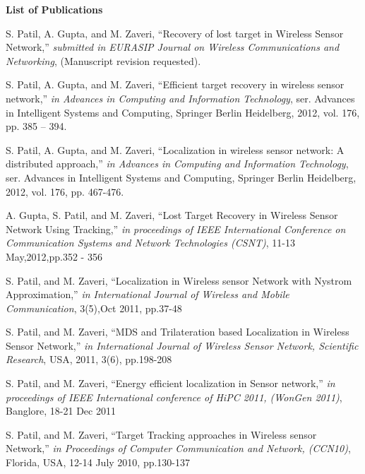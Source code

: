 \label{page:pub}
\begin{center}
\textbf{\Large List of Publications}
\end{center}
\vspace*{25pt}
\begin{enumerate}[{[1]}]

\item S. Patil, A. Gupta, and M. Zaveri, ``Recovery of lost target in Wireless Sensor Network,'' \textit{submitted in EURASIP Journal on Wireless Communications and Networking}, (Manuscript revision requested).

\item S. Patil, A. Gupta, and M. Zaveri, ``Efficient target recovery in wireless sensor network,” \textit{in Advances in Computing and Information Technology}, ser. Advances in Intelligent Systems and Computing, Springer Berlin Heidelberg, 2012, vol. 176, pp. 385 – 394.

\item S. Patil, A. Gupta, and M. Zaveri, ``Localization in wireless sensor network: A distributed approach,” \textit{in Advances in Computing and Information Technology}, ser. Advances in Intelligent Systems and Computing, Springer Berlin Heidelberg, 2012, vol. 176, pp. 467-476.

\item A. Gupta, S. Patil, and M. Zaveri, ``Lost Target Recovery in Wireless Sensor Network Using Tracking,'' \textit{in proceedings of IEEE International Conference on Communication Systems and Network Technologies (CSNT)}, 11-13 May,2012,pp.352 - 356

\item S. Patil, and M. Zaveri, ``Localization in Wireless sensor Network with Nystrom Approximation,'' \textit{in International Journal of Wireless and Mobile Communication}, 3(5),Oct 2011, pp.37-48

\item S. Patil, and M. Zaveri, ``MDS and Trilateration based Localization in Wireless Sensor Network,'' \textit{in International Journal of Wireless Sensor Network, Scientific Research}, USA, 2011, 3(6), pp.198-208

\item S. Patil, and M. Zaveri, ``Energy efficient localization in Sensor network,'' \textit{in proceedings of IEEE International conference of HiPC 2011, (WonGen 2011)}, Banglore, 18-21 Dec 2011

\item S. Patil, and M. Zaveri, ``Target Tracking approaches in Wireless sensor Network,'' \textit{in Proceedings of Computer Communication and Network, (CCN10)}, Florida, USA, 12-14 July 2010, pp.130-137

\end{enumerate}

\newpage